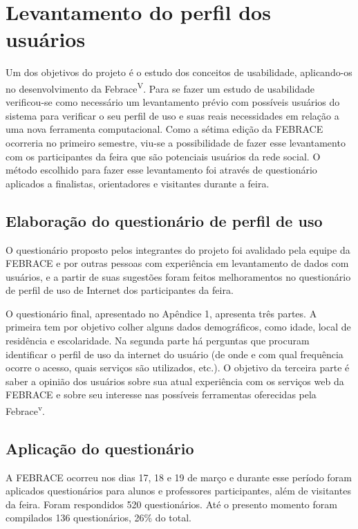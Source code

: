 \documentclass[a4paper,12pt,font=plain,header=plain]{abnt}
\begin{document}
\chapter{Levantamento do perfil dos usuários}
  Um dos objetivos do projeto é o estudo dos conceitos de usabilidade, aplicando-os no desenvolvimento da Febrace\textsuperscript{V}. Para se fazer um estudo de usabilidade verificou-se como necessário um levantamento prévio com possíveis usuários do sistema para verificar o seu perfil de uso e suas reais necessidades em relação a uma nova ferramenta computacional. Como a sétima edição da FEBRACE ocorreria no primeiro semestre, viu-se a possibilidade de fazer esse levantamento com os participantes da feira que são potenciais usuários da rede social. O método escolhido para fazer esse levantamento foi através de questionário aplicados a finalistas, orientadores e visitantes durante a feira.

  \section{Elaboração do questionário de perfil de uso}
    O questionário proposto pelos integrantes do projeto foi avalidado pela equipe da FEBRACE e por outras pessoas com experiência em levantamento de dados com usuários, e a partir de suas sugestões foram feitos melhoramentos no questionário de perfil de uso de Internet dos participantes da feira.

    O questionário final, apresentado no Apêndice 1, apresenta três partes. A primeira tem por objetivo colher alguns dados demográficos, como idade, local de residência e escolaridade. Na segunda parte há perguntas que procuram identificar o perfil de uso da internet do usuário (de onde e com qual frequência ocorre o acesso, quais serviços são utilizados, etc.). O objetivo da terceira parte é saber a opinião dos usuários sobre sua atual experiência com os serviços web da FEBRACE e sobre seu interesse nas possíveis ferramentas oferecidas pela Febrace\textsuperscript{v}.

  \section{Aplicação do questionário}
    A FEBRACE ocorreu nos dias 17, 18 e 19 de março e durante esse período foram aplicados questionários para alunos e professores participantes, além de visitantes da feira. Foram respondidos 520 questionários. Até o presento momento foram compilados 136 questionários, 26\% do total.
\end{document}
